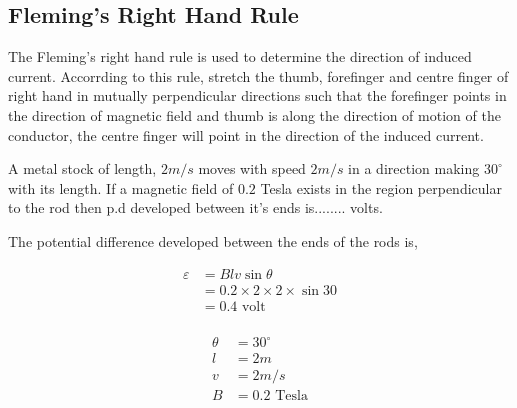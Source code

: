 \subsection{Fleming's Right Hand Rule}
The Fleming's right hand rule is used to determine the direction of induced current. Accorrding to this rule, stretch the thumb, forefinger and centre finger of right hand in mutually perpendicular directions such that the forefinger points in the direction of magnetic field and thumb is along the direction of motion of the conductor, the centre finger will point in the direction of the induced current.
\begin{exercise}
	A metal stock of length, $2 m/s$ moves with speed $2 m/s$ in a direction making $30^{\circ}$ with its length. If a magnetic field of $0.2$ Tesla exists in the region perpendicular to the rod then p.d developed between it's ends is........ volts.
\end{exercise}
\begin{answer}
	The potential difference developed between the ends of the rods is,\\ 
	\begin{minipage}{0.60\textwidth}\hfill
		\begin{align*}
		\varepsilon&=B l v \sin \theta\\
		&=0.2 \times 2 \times 2 \times \sin 30 \\
		&=0 .4 \text{ volt}\\
		\end{align*}
	\end{minipage}
	\begin{minipage}{0.40\textwidth}\hfill
		\begin{align*}
		\theta&=30^{\circ}\\
		l&=2 m\\
		v&=2 m/s\\
		B&=0.2 \text{ Tesla}
		\end{align*}
	\end{minipage}
\end{answer}
